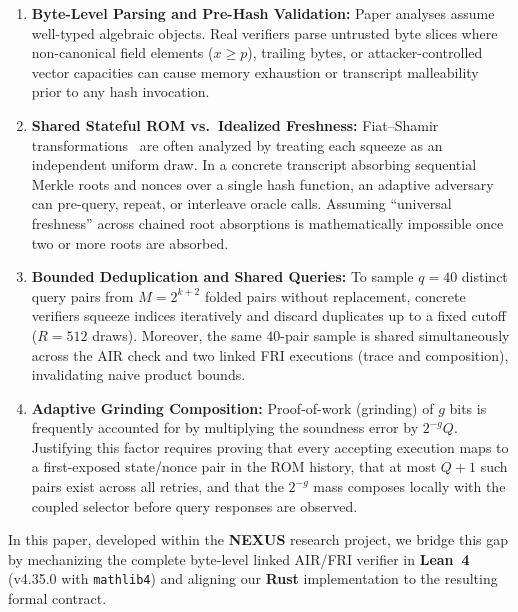 \documentclass[conference]{IEEEtran}
\theoremstyle{definition}
\begin{document}
\begin{enumerate}
    \setlength{\itemsep}{3pt}
    \item \textbf{Byte-Level Parsing and Pre-Hash Validation:} Paper analyses assume well-typed algebraic objects. Real verifiers parse untrusted byte slices where non-canonical field elements ($x \ge p$), trailing bytes, or attacker-controlled vector capacities can cause memory exhaustion or transcript malleability prior to any hash invocation.
    \item \textbf{Shared Stateful ROM vs.\ Idealized Freshness:} Fiat--Shamir transformations~\cite{fiat1986prove,ben2016aurora} are often analyzed by treating each squeeze as an independent uniform draw. In a concrete transcript absorbing sequential Merkle roots and nonces over a single hash function, an adaptive adversary can pre-query, repeat, or interleave oracle calls. Assuming ``universal freshness'' across chained root absorptions is mathematically impossible once two or more roots are absorbed.
    \item \textbf{Bounded Deduplication and Shared Queries:} To sample $q = 40$ distinct query pairs from $M = 2^{k+2}$ folded pairs without replacement, concrete verifiers squeeze indices iteratively and discard duplicates up to a fixed cutoff ($R = 512$ draws). Moreover, the same $40$-pair sample is shared simultaneously across the AIR check and two linked FRI executions (trace and composition), invalidating naive product bounds.
    \item \textbf{Adaptive Grinding Composition:} Proof-of-work (grinding) of $g$ bits is frequently accounted for by multiplying the soundness error by $2^{-g} Q$. Justifying this factor requires proving that every accepting execution maps to a first-exposed state/nonce pair in the ROM history, that at most $Q + 1$ such pairs exist across all retries, and that the $2^{-g}$ mass composes locally with the coupled selector before query responses are observed.
\end{enumerate}

In this paper, developed within the \textbf{NEXUS} research project, we bridge this gap by mechanizing the complete byte-level linked AIR/FRI verifier in \textbf{Lean~4} (v4.35.0 with \texttt{mathlib4}) and aligning our \textbf{Rust} implementation to the resulting formal contract.
\end{document}
